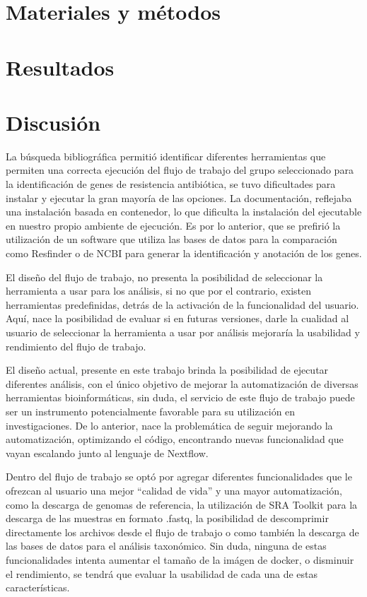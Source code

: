 \documentclass[12pt]{article}
\begin{document}
\newpage
\section{Materiales y métodos}

\newpage
\section{Resultados}

\newpage
\section{Discusión}
La búsqueda bibliográfica permitió identificar diferentes herramientas que permiten una correcta ejecución del flujo de trabajo del grupo seleccionado para la identificación de genes de resistencia antibiótica, se tuvo dificultades para instalar y ejecutar la gran mayoría de las opciones. La documentación, reflejaba una instalación basada en contenedor, lo que dificulta la instalación del ejecutable en nuestro propio ambiente de ejecución. Es por lo anterior, que se prefirió la utilización de un software que utiliza las bases de datos para la comparación como Resfinder o de NCBI para generar la identificación y anotación de los genes. 

El diseño del flujo de trabajo, no presenta la posibilidad de seleccionar la herramienta a usar para los análisis, si no que por el contrario, existen herramientas predefinidas, detrás de la activación de la funcionalidad del usuario. Aquí, nace la posibilidad  de evaluar si en futuras versiones, darle la cualidad al usuario de seleccionar la herramienta a usar por análisis mejoraría la usabilidad y rendimiento del flujo de trabajo. 

El diseño actual, presente en este trabajo brinda la posibilidad de ejecutar diferentes análisis, con el único objetivo de mejorar la automatización de diversas herramientas bioinformáticas, sin duda, el servicio de este flujo de trabajo puede ser un instrumento potencialmente favorable para su utilización en investigaciones. De lo anterior, nace la problemática de seguir mejorando la automatización, optimizando el código, encontrando nuevas funcionalidad que vayan escalando junto al lenguaje de Nextflow.

Dentro del flujo de trabajo se optó por agregar diferentes funcionalidades que le ofrezcan al usuario una mejor “calidad de vida” y una mayor automatización, como la descarga de genomas de referencia, la utilización de SRA Toolkit para la descarga de las muestras en formato .fastq, la posibilidad de descomprimir directamente los archivos desde el flujo de trabajo o como también la descarga de las bases de datos para el análisis taxonómico. Sin duda, ninguna de estas funcionalidades intenta aumentar el tamaño de la imágen de docker, o disminuir el rendimiento, se tendrá que evaluar la usabilidad de cada una de estas características.
\end{document}
